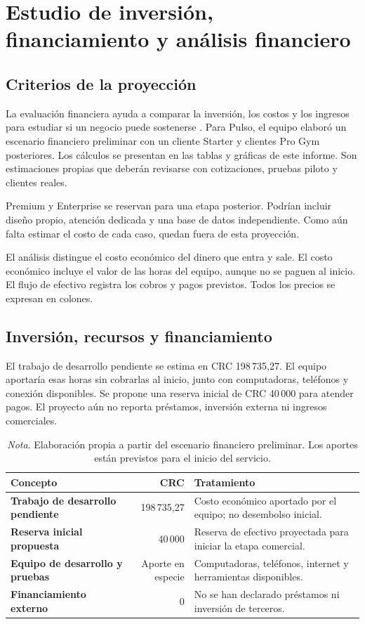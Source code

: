 \section{Estudio de inversión, financiamiento y análisis financiero}

\subsection{Criterios de la proyección}

La evaluación financiera ayuda a comparar la inversión, los costos y los
ingresos para estudiar si un negocio puede sostenerse \parencite{baca2016}.
Para Pulso, el equipo elaboró un escenario financiero preliminar con un cliente
Starter y clientes Pro Gym posteriores. Los cálculos se presentan en las tablas
y gráficas de este informe. Son estimaciones propias que deberán revisarse con
cotizaciones, pruebas piloto y clientes reales.

Premium y Enterprise se reservan para una etapa posterior. Podrían incluir
diseño propio, atención dedicada y una base de datos independiente. Como aún
falta estimar el costo de cada caso, quedan fuera de esta proyección.

El análisis distingue el costo económico del dinero que entra y sale. El costo
económico incluye el valor de las horas del equipo, aunque no se paguen al
inicio. El flujo de efectivo registra los cobros y pagos previstos. Todos los
precios se expresan en colones.

\subsection{Inversión, recursos y financiamiento}

El trabajo de desarrollo pendiente se estima en CRC 198\,735,27. El equipo
aportaría esas horas sin cobrarlas al inicio, junto con computadoras, teléfonos
y conexión disponibles. Se propone una reserva inicial de CRC 40\,000 para
atender pagos. El proyecto aún no reporta préstamos, inversión externa ni
ingresos comerciales.

\begin{table}[htbp]
\caption{Recursos e inversión inicial de Pulso}
\begin{tabularx}{\textwidth}{>{\bfseries}p{3.8cm}r X}
\toprule
Concepto & CRC & Tratamiento \\
\midrule
Trabajo de desarrollo pendiente & 198\,735,27 & Costo económico aportado por el equipo; no desembolso inicial. \\
Reserva inicial propuesta & 40\,000 & Reserva de efectivo proyectada para iniciar la etapa comercial. \\
Equipo de desarrollo y pruebas & Aporte en especie & Computadoras, teléfonos, internet y herramientas disponibles. \\
Financiamiento externo & 0 & No se han declarado préstamos ni inversión de terceros. \\
\bottomrule
\end{tabularx}
\caption*{\textit{Nota}. Elaboración propia a partir del escenario financiero preliminar. Los aportes están previstos para el inicio del servicio.}
\end{table}

